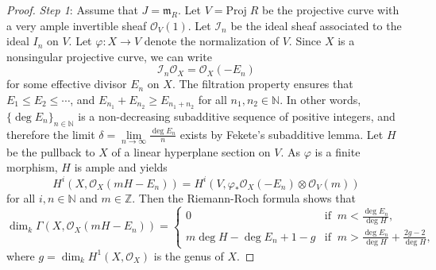 \documentclass[12pt,a4paper]{amsart}
\theoremstyle{plain}
\theoremstyle{definition}
\numberwithin{equation}{theorem}
\begin{document}
\begin{proof}
\emph{Step 1}: Assume that $J=\mathfrak{m}_R$. Let $V = \mathrm{Proj}\;R$ be the projective curve with a very ample invertible sheaf $\mathcal{O}_V(1)$. Let $\mathcal{I}_n$ be the ideal sheaf associated to the ideal $I_n$ on $V$. Let $\varphi\colon X \to V$ denote the normalization of $V$. Since $X$ is a nonsingular projective curve, we can write $$\mathcal{I}_n\mathcal{O}_X = \mathcal{O}_X(-E_n)$$ for some effective divisor $E_n$ on $X$. The filtration property ensures that $E_1 \leq E_2 \leq \cdots$, and $E_{n_1} + E_{n_2} \geq E_{n_1+n_2}$ for all $n_1,n_2\in\mathbb{N}$. In other words, $\{\deg E_n\}_{n\in\mathbb{N}}$ is a non-decreasing subadditive sequence of positive integers, and therefore the limit $\delta = \lim\limits_{n\to\infty}\frac{\deg E_n}{n}$ exists by Fekete's subadditive lemma. Let $H$ be the pullback to $X$ of a linear hyperplane section on $V$. As $\varphi$ is a finite morphism, $H$ is ample and \cite[Chapter III, Exercise 4.1]{Har77} yields
\begin{equation}\label{dim2_eq1}
 H^i\left(X,\mathcal{O}_X(mH-E_n)\right) = H^i\left(V,\varphi_*\mathcal{O}_X(-E_n)\otimes \mathcal{O}_V(m)\right)
\end{equation}
for all $i,n \in\mathbb{N}$ and $m\in\mathbb{Z}$. Then the Riemann-Roch formula \cite[Chapter IV.1]{Har77} shows that
\begin{equation}\label{dim2_eq2}
 \dim_k\Gamma\left(X,\mathcal{O}_X(mH-E_n)\right) = \begin{cases}
                                                     0 & \text{if}\;\;m<\frac{\deg E_n}{\deg H},\\
                                                     m\deg H - \deg E_n + 1-g & \text{if}\;\;m>\frac{\deg E_n}{\deg H} + \frac{2g-2}{\deg H},
                                                    \end{cases}
\end{equation}
where $g = \dim_k H^1(X,\mathcal{O}_X)$ is the genus of $X$.


\end{proof}
\end{document}
